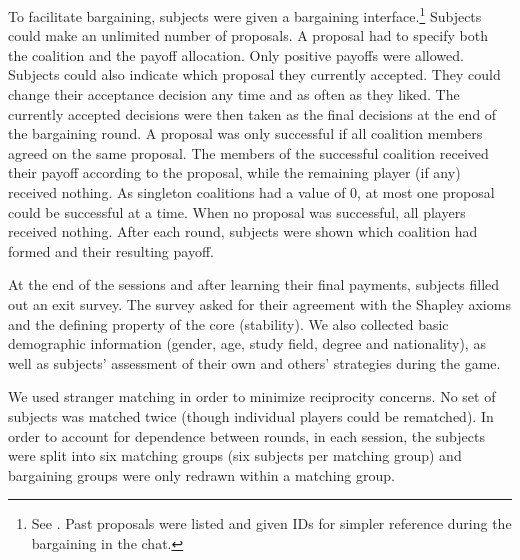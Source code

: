 \documentclass[12pt]{article}
\begin{document}
To facilitate bargaining, subjects were given a bargaining interface.\footnote{See . Past proposals were listed and given IDs for simpler reference during the bargaining in the chat.} Subjects could make an unlimited number of proposals. A proposal had to specify both the coalition and the payoff allocation. Only positive payoffs were allowed. Subjects could also indicate which proposal they currently accepted. They could change their acceptance decision any time and as often as they liked. The currently accepted decisions were then taken as the final decisions at the end of the bargaining round. A proposal was only successful if all coalition members agreed on the same proposal. The members of the successful coalition received their payoff according to the proposal, while the remaining player (if any) received nothing. As singleton coalitions had a value of 0, at most one proposal could be successful at a time. When no proposal was successful, all players received nothing. After each round, subjects were shown which coalition had formed and their resulting payoff.

At the end of the sessions and after learning their final payments, subjects filled out an exit survey. The survey asked for their agreement with the Shapley axioms and the defining property of the core (stability). We also collected basic demographic information (gender, age, study field, degree and nationality), as well as subjects' assessment of their own and others' strategies during the game.


We used stranger matching in order to minimize reciprocity concerns. No set of subjects was matched twice (though individual players could be rematched). In order to account for dependence between rounds, in each session, the subjects were split into six matching groups (six subjects per matching group) and bargaining groups were only redrawn within a matching group. 
\end{document}
